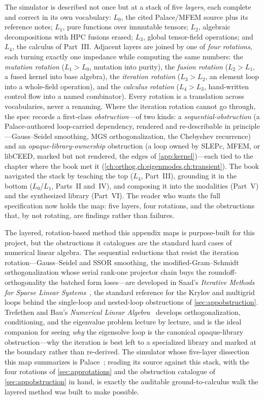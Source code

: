 \summarysection
The simulator is described not once but at a stack of five \emph{layers}, each complete
and correct in its own vocabulary: $L_0$, the cited Palace/MFEM source plus its
reference notes; $L_1$, pure functions over immutable tensors; $L_2$, algebraic
decompositions with HPC fusions erased; $L_3$, global tensor-field operations; and
$L_4$, the calculus of Part~III. Adjacent layers are joined by one of \emph{four
rotations}, each turning exactly one impedance while computing the same numbers: the
\emph{mutation rotation} ($L_1>L_0$, mutation into purity), the \emph{fusion rotation}
($L_2>L_1$, a fused kernel into base algebra), the \emph{iteration rotation} ($L_3>L_2$,
an element loop into a whole-field operation), and the \emph{calculus rotation}
($L_4>L_3$, hand-written control flow into a named combinator). Every rotation is a
translation across vocabularies, never a renaming. Where the iteration rotation cannot
go through, the spec records a first-class \emph{obstruction}---of two kinds: a
\emph{sequential-obstruction} (a Palace-authored loop-carried dependency, rendered and
re-describable in principle---Gauss--Seidel smoothing, MGS orthogonalization, the
Chebyshev recurrence) and an \emph{opaque-library-ownership} obstruction (a loop owned
by SLEPc, MFEM, or libCEED, marked but not rendered, the  edges of
\cref{app:kernel})---each tied to the chapter where the book met it
(\cref{ch:orthog,ch:eigenmodes,ch:transient}). The book navigated the stack by teaching
the top ($L_4$, Part~III), grounding it in the bottom ($L_0$/$L_1$, Parts~II and~IV),
and composing it into the modalities (Part~V) and the synthesized library (Part~VI).
The reader who wants the full specification now holds the map: five layers, four
rotations, and the obstructions that, by not rotating, are findings rather than
failures.

\furtherreading
The layered, rotation-based method this appendix maps is purpose-built for this project,
but the obstructions it catalogues are the standard hard cases of numerical linear
algebra. The sequential reductions that resist the iteration rotation---Gauss--Seidel
and SSOR smoothing, the modified-Gram--Schmidt orthogonalization whose serial
rank-one projector chain buys the roundoff-orthogonality the batched form loses---are
developed in Saad's \emph{Iterative Methods for Sparse Linear
Systems}~\citep{saad2003}, the standard reference for the Krylov and multigrid loops
behind the single-loop and nested-loop obstructions of \cref{sec:appobstruction}.
Trefethen and Bau's \emph{Numerical Linear Algebra}~\citep{trefethenbau1997} develops
orthogonalization, conditioning, and the eigenvalue problem lecture by lecture, and is
the ideal companion for seeing \emph{why} the eigensolve loop is the canonical
opaque-library obstruction---why the iteration is best left to a specialized library
and marked at the boundary rather than re-derived. The simulator whose five-layer
dissection this map summarizes is Palace~\citep{palace2023}; reading its source against
this stack, with the four rotations of \cref{sec:approtations} and the obstruction
catalogue of \cref{sec:appobstruction} in hand, is exactly the auditable
ground-to-calculus walk the layered method was built to make possible.
